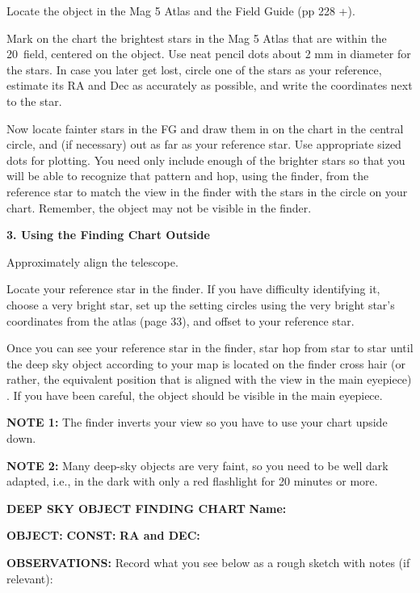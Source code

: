 \documentclass[12pt]{article}
\begin{document}
\medskip\noindent
Locate the object in the Mag 5 Atlas and the Field Guide (pp 228 +).

\medskip\noindent
Mark on the chart the brightest stars in the Mag 5 Atlas that are within the
20\deg\ field,  centered on the
object.  Use neat pencil dots about 2 mm in diameter for the stars.
In case you later get lost, circle one of the stars as your reference,
estimate its RA and Dec as accurately as possible, and write the
coordinates next to the star.

\medskip\noindent Now locate fainter stars in the FG and draw them in
on the chart in the central circle, and (if necessary) out as far as
your reference star. Use appropriate sized dots for plotting. You need
only include enough of the brighter stars so that you will be able to
recognize that pattern and hop, using the finder, from the reference
star to match the view in the finder with the stars in the circle on
your chart.  Remember, the object may not be visible in the finder.

\bigskip
\bigskip\noindent
{\bf 3. Using the Finding Chart Outside} 

\medskip\noindent
Approximately align the telescope.

\medskip\noindent
Locate your reference star in the finder. If you have difficulty
identifying it, choose a very bright star, set up the setting circles
using the very bright star's coordinates from the atlas (page 33),
and offset to your reference star.

\medskip\noindent
Once you can see your reference star in the finder, star hop from star
to star until the deep sky object according to your map is located on
the finder cross hair (or rather, the equivalent position that is
aligned with the view in the main eyepiece) . If you have been
careful, the object should be visible in the main eyepiece.

\bigskip\noindent
{\bf NOTE 1:} The finder inverts your view so you have to use your
chart upside down.


\medskip\noindent
{\bf NOTE 2:} Many deep-sky objects are very faint, so you need to be well
dark adapted, i.e., in the dark with only a red flashlight for 20
minutes or more.



\newpage
\pagestyle{empty}
\noindent
{\bf DEEP SKY OBJECT FINDING CHART    \hfill} {\bf  Name:\makebox[4cm]{\hrulefill}}

\vspace{1.0cm}

\noindent
{\bf OBJECT:} {\makebox[3cm]{\hrulefill}}   
{\bf CONST:} {\makebox[3cm]{\hrulefill}} 
{\bf RA and DEC:} {\makebox[3cm]{\hrulefill}}      

\vspace{16cm}

\noindent
{\bf OBSERVATIONS:}
Record what you see below as a rough sketch with notes (if relevant):
\end{document}
